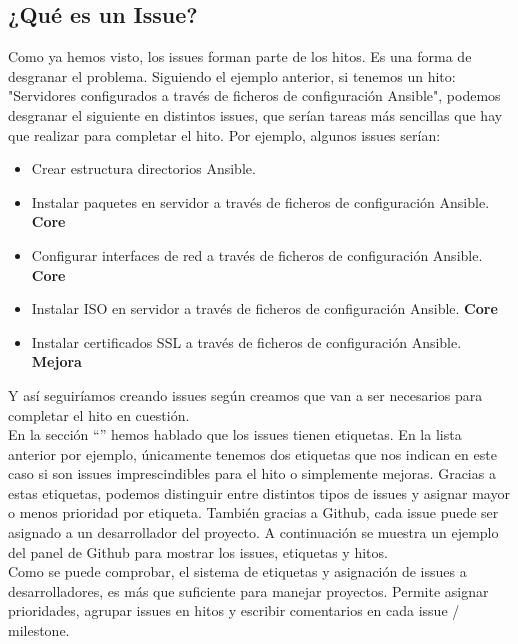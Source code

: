 \subsection{¿Qué es un Issue?}

\begin{text}
	Como ya hemos visto, los issues forman parte de los hitos. Es una forma de desgranar el problema. Siguiendo el ejemplo anterior, si tenemos un hito: "Servidores configurados a través de ficheros de configuración Ansible", podemos desgranar el siguiente en distintos issues, que serían tareas más sencillas que hay que realizar para completar el hito. Por ejemplo, algunos issues serían: 
	\begin{itemize}
		\item Crear estructura directorios Ansible.
		\item Instalar paquetes en servidor a través de ficheros de configuración Ansible. \textbf{Core}
		\item Configurar interfaces de red a través de ficheros de configuración Ansible. \textbf{Core}
		\item Instalar ISO en servidor a través de ficheros de configuración Ansible. \textbf{Core}
		\item Instalar certificados SSL a través de ficheros de configuración Ansible. \textbf{Mejora}
	\end{itemize}
	
	Y así seguiríamos creando issues según creamos que van a ser necesarios para completar el hito en cuestión. \\
	En la sección ``'' hemos hablado que los issues tienen etiquetas. En la lista anterior por ejemplo, únicamente tenemos dos etiquetas que nos indican en este caso si son issues imprescindibles para el hito o simplemente mejoras. Gracias a estas etiquetas, podemos distinguir entre distintos tipos de issues y asignar mayor o menos prioridad por etiqueta. También gracias a Github, cada issue puede ser asignado a un desarrollador del proyecto. A continuación se muestra un ejemplo del panel de Github para mostrar los issues, etiquetas y hitos. \\
	Como se puede comprobar, el sistema de etiquetas y asignación de issues a desarrolladores, es más que suficiente para manejar proyectos. Permite asignar prioridades, agrupar issues en hitos y escribir comentarios en cada issue / milestone. 
	
\end{text}

